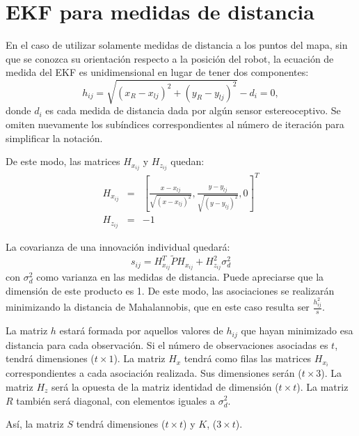 
\chapter{EKF para medidas de distancia}

En el caso de utilizar solamente medidas de distancia a los puntos del mapa, sin que se conozca su orientación respecto a la posición del robot, la ecuación de medida del EKF es unidimensional en lugar de tener dos componentes:
\begin{equation}\label{eq:medida1}
    h_{ij}=\sqrt{(x_{R}-x_{lj})^{2} + (y_{R}-y_{lj})^{2}} - d_{i} = 0,
\end{equation}
donde $d_{i}$ es cada medida de distancia dada por algún sensor estereoceptivo. Se omiten nuevamente los subíndices correspondientes al número de iteración para simplificar la notación.

De este modo, las matrices $H_{x_{ij}}$ y $H_{z_{ij}}$ quedan:
\begin{eqnarray*}
  H_{x_{ij}} & =  & \left [ \frac{x-x_{lj}}{\sqrt{(x-x_{lj})^{2}}}, \frac{y - y_{lj}}{\sqrt{(y - y_{lj})^{2}}},
   0 \right ] ^{T}\\
  H_{z_{ij}} & = & -1
\end{eqnarray*}

La covarianza de una innovación individual quedará:
\begin{equation}\label{eq:s}
    s_{ij}= H_{x_{ij}}^{T}\tilde{P}H_{x_{ij}} + H_{z_{ij}}^{2} \sigma_{d}^{2}
\end{equation}
con $ \sigma_{d}^{2}$ como varianza en las medidas de distancia. Puede apreciarse que la dimensión de este producto es 1. De este modo, las asociaciones se realizarán minimizando la distancia de Mahalannobis, que en este caso resulta ser $\frac{h_{ij}^{2}}{s}$.

La matriz $h$ estará formada por aquellos valores de $h_{ij}$ que hayan minimizado esa distancia para cada observación. Si el número de observaciones asociadas es $t$, tendrá dimensiones ($t\times 1$). La matriz $H_{x}$ tendrá como filas las matrices $H_{x_{i}}$ correspondientes a cada asociación realizada. Sus dimensiones serán ($t\times 3$). La matriz $H_{z}$ será la opuesta de la matriz identidad de dimensión ($t\times t$). La matriz $R$ también será diagonal, con elementos iguales a $ \sigma_{d}^{2}$.

Así, la matriz $S$ tendrá dimensiones ($t \times t$) y $K$, ($3 \times t$).

